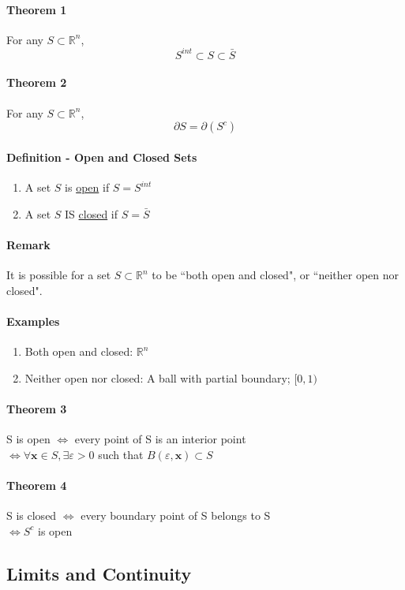 \documentclass[11pt]{article}
\newcommand{\tb}[1]{\textbf{#1}}
\newcommand{\real}[0]{\mathbb{R}}
\newcommand{\under}[1]{\underline{#1}}
\newcommand{\vx}[0]{\tb{x}}
\begin{document}
\paragraph{Theorem 1} For any $S \subset \real^n$, $$S^{int} \subset S \subset \bar{S}$$
\paragraph{Theorem 2} For any $S \subset \real^n$, $$\partial S = \partial (S^c)$$
\paragraph{Definition - Open and Closed Sets}
\begin{enumerate}
    \item A set $S$ is \under{open} if $S = S^{int}$
    \item A set $S$ IS \under{closed} if $S = \bar{S}$
\end{enumerate}
\paragraph{Remark}
It is possible for a set $S \subset \real^n$ to be ``both open and closed", or ``neither open nor closed".
\paragraph{Examples}
\begin{enumerate}
	\item Both open and closed: $\real^n$
	\item Neither open nor closed: A ball with partial boundary; $[0, 1)$
\end{enumerate}
\paragraph{Theorem 3}
S is open $\iff$ every point of S is an interior point\\
$\iff \forall \vx \in S, \exists \varepsilon > 0$ such that $B(\varepsilon, \vx) \subset S$
\paragraph{Theorem 4}
S is closed $\iff$ every boundary point of S belongs to S \\
$\iff S^c$ is open

\subsection{Limits and Continuity}
\end{document}
